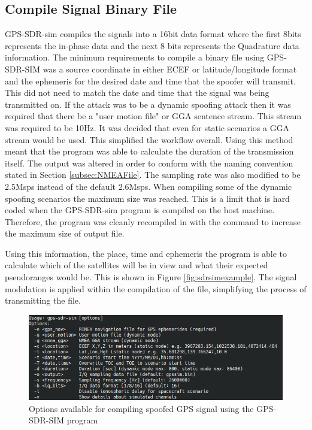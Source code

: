 \subsection{Compile Signal Binary File}
GPS-SDR-sim compiles the signals into a 16bit data format where the first 8bits represents the in-phase data and the next 8 bits represents the Quadrature data information.
The minimum requirements to compile a binary file using GPS-SDR-SIM was a source coordinate in either ECEF or latitude/longitude format and the ephemeris for the desired date and time that the spoofer
will transmit. This did not need to match the date and time that the signal was being transmitted on. If the attack was to be a dynamic spoofing attack then it was
required that there be a "user motion file" or GGA sentence stream. This stream was required to be 10Hz. It was decided that even for static scenarios a GGA stream would
be used. This simplified the workflow overall. Using this method meant that the program was able to calculate the duration of the transmission itself. The output was
altered in order to conform with the naming convention stated in Section \ref{subsec:NMEAFile}. The sampling rate was also modified to be 2.5Msps instead of the default
2.6Msps.
When compiling some of the dynamic spoofing scenarios the maximum size was reached. This is a limit that is hard coded when the GPS-SDR-sim program is compiled on the host
machine. Therefore, the program was cleanly recompiled in with the command to increase the maximum size of output file.

Using this information, the place, time and ephemeris the program is able to calculate which of the satellites will be in view and what their expected pseudoranges would
be. This is shown in Figure \ref{fig:sdrsimexample}.
The signal modulation is applied within the compilation of the file, simplifying the process of transmitting the file. 

\begin{figure}[!ht]
    \begin{centering}
        \includegraphics[width=14cm,keepaspectratio]{Figures/gps-sdr-sim options.png}
        \caption{Options available for compiling spoofed GPS signal using the GPS-SDR-SIM program}
    \label{fig:sdrsimoptions}
    \end{centering}
\end{figure}

